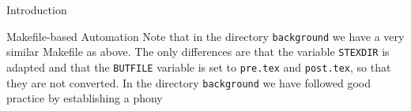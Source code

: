 \begin{omgroup}[id=intro]{Introduction}
\begin{omgroup}{Makefile-based Automation}
  Note that in the directory {\texttt{background}} we have a very similar Makefile as
  above. The only differences are that the variable {\lstinline{STEXDIR}} is adapted and
  that the {\lstinline{BUTFILE}} variable is set to {\texttt{pre.tex}} and
  {\texttt{post.tex}}, so that they are not converted. In the directory
  {\texttt{background}} we have followed good practice by establishing a phony 
\end{omgroup}

\end{omgroup}

